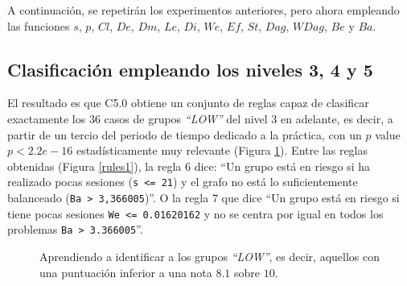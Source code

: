 A continuación, se repetirán los experimentos anteriores, pero ahora empleando las funciones $s$, $p$, $Cl$, $De$, $Dm$, $Le$, $Di$, $We$, $Ef$, $St$, $Dag$, $WDag$, $Be$ y $Ba$.

\subsection{Clasificación empleando los niveles 3, 4 y 5}

El resultado es que C5.0 obtiene un conjunto de reglas capaz de clasificar exactamente los $36$ casos de grupos \emph{``LOW''} del nivel $3$ en adelante, es decir, a partir de un tercio del periodo de tiempo dedicado a la práctica, con un $p$ value $p < 2.2e-16$ estadísticamente muy relevante (Figura \ref{fig:cm1}). Entre las reglas obtenidas (Figura \ref{rules1}), la regla $6$ dice: ``Un grupo está en riesgo si ha realizado pocas sesiones (\texttt{s <= 21}) y el grafo no está lo suficientemente balanceado (\texttt{Ba > 3,366005})''. O la regla $7$ que dice ``Un grupo está en riesgo si tiene pocas sesiones \texttt{We <= 0.01620162} y no se centra por igual en todos los problemas \texttt{Ba > 3.366005}''. %

\begin{figure}[H]
\centering
{}
\caption{Aprendiendo a identificar a los grupos \emph{``LOW''}, es decir, aquellos con una puntuación inferior a una nota $8.1$ sobre $10$.}
\label{fig:cm1}
\end{figure}

